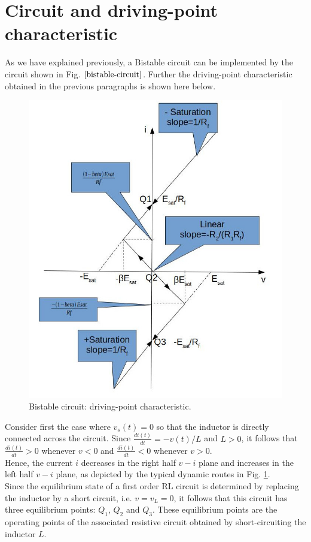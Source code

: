 \documentclass[letterpaper,11pt]{article}
\begin{document}
\section{Circuit and driving-point characteristic}
As we have explained previously, a Bistable circuit can be implemented by the circuit shown in Fig. $\ref{bistable-circuit}$.
Further the driving-point characteristic obtained in the previous paragraphs is shown here below.
\begin{figure}[!ht]
        \centering \includegraphics[width=0.8\columnwidth]{driving-point-characteristic.jpg}\caption{\label{driving-point characteristic}Bistable circuit: driving-point characteristic.
        }
\end{figure}
Consider first the case where $v_s(t) = 0$ so that the inductor is directly connected across the circuit. Since $\frac{di(t)}{dt}=-v(t)/L$ and $L>0$, it follows that $\frac{di(t)}{dt}>0$ whenever $v < 0$ and $\frac{di(t)}{dt} < 0$ whenever $v>0$.\\
Hence, the current $i$ decreases in the right half $v-i$ plane and increases in the left half $v-i$ plane, as depicted by the typical dynamic routes in Fig. \ref{driving-point characteristic}.\\
Since the equilibrium state of a first order RL circuit is determined by replacing the inductor by a short circuit, i.e. $v=v_L=0$, it follows that this circuit has three equilibrium points: $Q_1$, $Q_2$ and $Q_3$. These equilibrium points are the operating points of the associated resistive circuit obtained by short-circuiting the inductor $L$.\\
\end{document}
